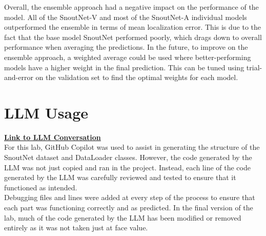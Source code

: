 \documentclass[letterpaper,11pt]{article}
\begin{document}
Overall, the ensemble approach had a negative impact on the performance of the model. All of the SnoutNet-V and most of the SnoutNet-A individual models outperformed the ensemble in terms of mean localization error. This is due to the fact that the base model SnoutNet performed poorly, which drags down to overall performance when averaging the predictions. In the future, to improve on the ensemble approach, a weighted average could be used where better-performing models have a higher weight in the final prediction. This can be tuned using trial-and-error on the validation set to find the optimal weights for each model.

\section{LLM Usage}
\textcolor{blue}{\textbf{\href{https://github.com/copilot/share/88025032-03a4-8871-b803-a44664ab6910}{Link to LLM Conversation}}}\\

For this lab, GitHub Copilot was used to assist in generating the structure of the SnoutNet dataset and DataLoader classes. However, the code generated by the LLM was not just copied and ran in the project. Instead, each line of the code generated by the LLM was carefully reviewed and tested to ensure that it functioned as intended. \\

Debugging files and lines were added at every step of the process to ensure that each part was functioning correctly and as predicted. In the final version of the lab, much of the code generated by the LLM has been modified or removed entirely as it was not taken just at face value.
\end{document}
